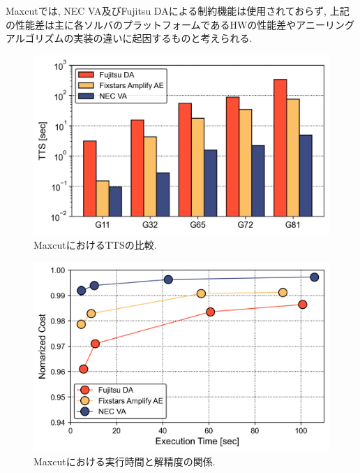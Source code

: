 \documentclass[submit,techrep,noauthor]{ipsj}
\begin{document}
Maxcutでは, NEC VA及びFujitsu DAによる制約機能は使用されておらず, 上記の性能差は主に各ソルバのプラットフォームであるHWの性能差やアニーリングアルゴリズムの実装の違いに起因するものと考えられる.

\begin{figure}[hb]
\centering
\includegraphics[bb=0 0 700 250, width=15cm]{TTS_Maxcut.png}
\caption{MaxcutにおけるTTSの比較.}
\label{Maxcut_TTS}
\end{figure}

\begin{figure}[hb]
\centering
\includegraphics[bb=0 0 700 250, width=15cm]{Energy_Maxcut.png}
\caption{Maxcutにおける実行時間と解精度の関係.}
\label{Maxcut_Time_Cost}
\end{figure}

\end{document}

